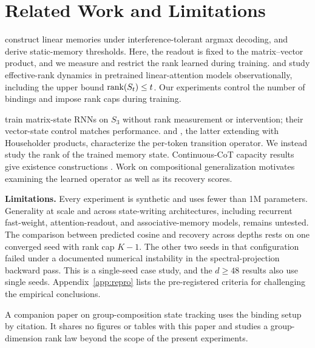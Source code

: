 \section{Related Work and Limitations}
\label{sec:related}

\citet{nichani2025factual} construct linear memories under
interference-tolerant argmax decoding, and \citet{barnfield2026sharp}
derive static-memory thresholds. Here, the readout is fixed to the
matrix--vector product, and we measure and restrict the rank learned
during training. \citet{nazari2026rank} and \citet{sun2026staterank}
study effective-rank dynamics in pretrained linear-attention models
observationally, including the upper bound $\operatorname{rank}(S_t) \leq t$.
Our experiments control the number of bindings and impose rank caps
during training.

\citet{mishra2026m2rnn} train matrix-state RNNs on $S_3$ without rank
measurement or intervention; their vector-state control matches
performance. \citet{grazzi2025negative} and
\citet{siems2025deltaproduct}, the latter extending
\citet{yang2024deltanet} with Householder products, characterize the
per-token transition operator. We instead study the rank of the
trained memory state. Continuous-CoT capacity results give existence
constructions \citep{zhu2025superposition,gozeten2025cot2}. Work on
compositional generalization
\citep{dziri2023faithfate,wang2024grokked} motivates examining the
learned operator as well as its recovery scores.

\textbf{Limitations.} Every experiment is synthetic and uses fewer
than 1M parameters. Generality at scale and across state-writing
architectures, including recurrent fast-weight, attention-readout,
and associative-memory models, remains untested.
The comparison between predicted cosine and recovery across depths
rests on one converged seed with rank cap $K{-}1$. The other two
seeds in that configuration failed under a documented numerical
instability in the spectral-projection backward pass. This is a
single-seed case study, and the $d \geq 48$ results also use single
seeds. Appendix~\ref{app:repro} lists the pre-registered criteria
for challenging the empirical conclusions.

A companion paper on group-composition state tracking
\citep{larson2026ranklaw} uses the binding setup by citation. It shares
no figures or tables with this paper and studies a group-dimension
rank law beyond the scope of the present experiments.
